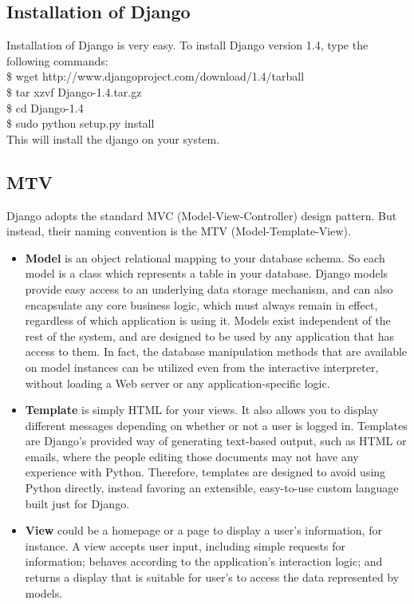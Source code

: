 \subsection{Installation of Django}
Installation of Django is very easy. To install Django version 1.4,
type the following commands:\\

	\$ wget http://www.djangoproject.com/download/1.4/tarball\\


	\$ tar xzvf Django-1.4.tar.gz\\


	\$ cd Django-1.4\\


	\$ sudo python setup.py install \\

\noindent This will install the django on your system.
 
\noindent \subsection{MTV} Django adopts the standard 
MVC (Model-View-Controller) design pattern. But instead, their naming 
convention is the MTV (Model-Template-View).
\begin{itemize}
\item {\bf{Model}} is an object relational mapping to your 
database schema. So each model is a class which represents a table in 
your database. Django models provide easy access to an underlying data 
storage mechanism, and can also encapsulate any core business logic, 
which must always remain in effect, regardless of which application is 
using it. Models exist independent of the rest of the system, and are 
designed to be used by any application that has access to them. In 
fact, the database manipulation methods that are available on model 
instances can be utilized even from the interactive interpreter, 
without loading a Web server or any application-specific logic.

\item {\bf{Template}} is simply HTML for your views. It also 
allows you to display different messages depending on whether or not a 
user is logged in. Templates are Django's provided way of generating 
text-based output, such as HTML or emails, where the people editing 
those documents may not have any experience with Python. Therefore, 
templates are designed to avoid using Python directly, instead favoring 
an extensible, easy-to-use custom language built just for Django.

\item {\bf{View}} could be a homepage or a page to display a 
user's information, for instance. A view accepts user input, including 
simple requests for information; behaves according to the application's 
interaction logic; and returns a display that is suitable for user's to 
access the data represented by models.
\end{itemize}
